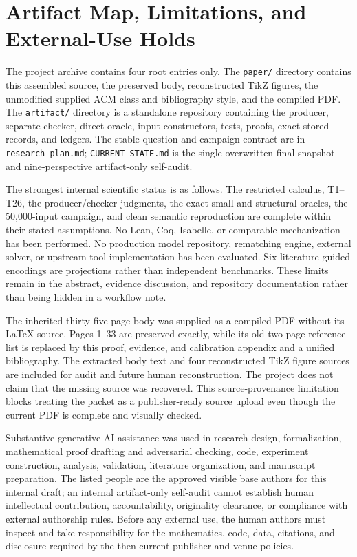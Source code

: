 \section{Artifact Map, Limitations, and External-Use Holds}
\label{app:artifact}

The project archive contains four root entries only.  The \texttt{paper/} directory
contains this assembled source, the preserved body, reconstructed TikZ figures, the
unmodified supplied ACM class and bibliography style, and the compiled PDF.  The
\texttt{artifact/} directory is a standalone repository containing the producer,
separate checker, direct oracle, input constructors, tests, proofs, exact stored
records, and ledgers.  The stable question and campaign contract are in
\texttt{research-plan.md}; \texttt{CURRENT-STATE.md} is the single overwritten final
snapshot and nine-perspective artifact-only self-audit.

The strongest internal scientific status is as follows.  The restricted calculus,
T1--T26, the producer/checker judgments, the exact small and structural oracles, the
50,000-input campaign, and clean semantic reproduction are complete within their
stated assumptions.  No Lean, Coq, Isabelle, or comparable mechanization has been
performed.  No production model repository, rematching engine, external solver, or
upstream tool implementation has been evaluated.  Six literature-guided encodings
are projections rather than independent benchmarks.  These limits remain in the
abstract, evidence discussion, and repository documentation rather than being hidden
in a workflow note.

The inherited thirty-five-page body was supplied as a compiled PDF without its
LaTeX source.  Pages 1--33 are preserved exactly, while its old two-page reference
list is replaced by this proof, evidence, and calibration appendix and a unified
bibliography.  The extracted body text and four reconstructed TikZ figure sources are
included for audit and future human reconstruction.  The project does not claim that
the missing source was recovered.  This source-provenance limitation blocks treating
the packet as a publisher-ready source upload even though the current PDF is complete
and visually checked.

Substantive generative-AI assistance was used in research design, formalization,
mathematical proof drafting and adversarial checking, code, experiment construction,
analysis, validation, literature organization, and manuscript preparation.  The
listed people are the approved visible base authors for this internal draft; an
internal artifact-only self-audit cannot establish human intellectual contribution,
accountability, originality clearance, or compliance with external authorship rules.
Before any external use, the human authors must inspect and take responsibility for
the mathematics, code, data, citations, and disclosure required by the then-current
publisher and venue policies.

